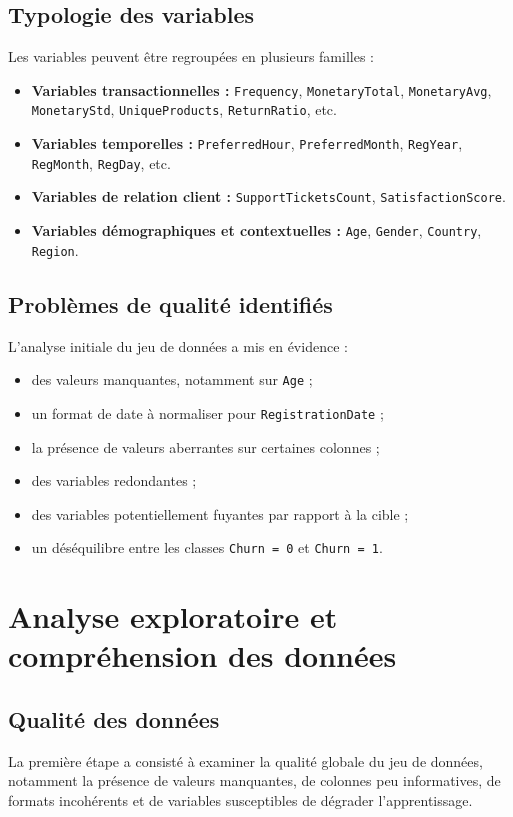 \documentclass[11pt,a4paper]{article}
\begin{document}
\subsection{Typologie des variables}
Les variables peuvent être regroupées en plusieurs familles :
\begin{itemize}
    \item \textbf{Variables transactionnelles :} \texttt{Frequency}, \texttt{MonetaryTotal}, \texttt{MonetaryAvg}, \texttt{MonetaryStd}, \texttt{UniqueProducts}, \texttt{ReturnRatio}, etc.
    \item \textbf{Variables temporelles :} \texttt{PreferredHour}, \texttt{PreferredMonth}, \texttt{RegYear}, \texttt{RegMonth}, \texttt{RegDay}, etc.
    \item \textbf{Variables de relation client :} \texttt{SupportTicketsCount}, \texttt{SatisfactionScore}.
    \item \textbf{Variables démographiques et contextuelles :} \texttt{Age}, \texttt{Gender}, \texttt{Country}, \texttt{Region}.
\end{itemize}

\subsection{Problèmes de qualité identifiés}
L’analyse initiale du jeu de données a mis en évidence :
\begin{itemize}
    \item des valeurs manquantes, notamment sur \texttt{Age} ;
    \item un format de date à normaliser pour \texttt{RegistrationDate} ;
    \item la présence de valeurs aberrantes sur certaines colonnes ;
    \item des variables redondantes ;
    \item des variables potentiellement fuyantes par rapport à la cible ;
    \item un déséquilibre entre les classes \texttt{Churn = 0} et \texttt{Churn = 1}.
\end{itemize}

\section{Analyse exploratoire et compréhension des données}

\subsection{Qualité des données}
La première étape a consisté à examiner la qualité globale du jeu de données, notamment la présence de valeurs manquantes, de colonnes peu informatives, de formats incohérents et de variables susceptibles de dégrader l’apprentissage.
\end{document}
